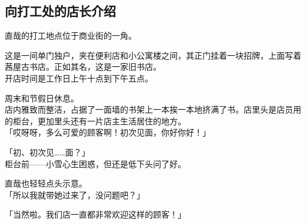 \subsection{向打工处的店长介绍}

直哉的打工地点位于商业街的一角。

这是一间单门独户，夹在便利店和小公寓楼之间，其正门挂着一块招牌，上面写着茜屋古书店。正如其名，这是一家旧书店。\\

开店时间是工作日上午十点到下午五点。

周末和节假日休息。\\

店内雅致而整洁，占据了一面墙的书架上一本挨一本地挤满了书。店里头是店员用的柜台，更加里头还有一片店主生活居住的地方。\\

「哎呀呀，多么可爱的顾客啊！初次见面，你好你好！」

「初、初次见……面？」\\

柜台前——小雪心生困惑，但还是低下头问了好。

直哉也轻轻点头示意。\\

「所以我就带她过来了，没问题吧？」

「当然啦。我们店一直都非常欢迎这样的顾客！」\\

